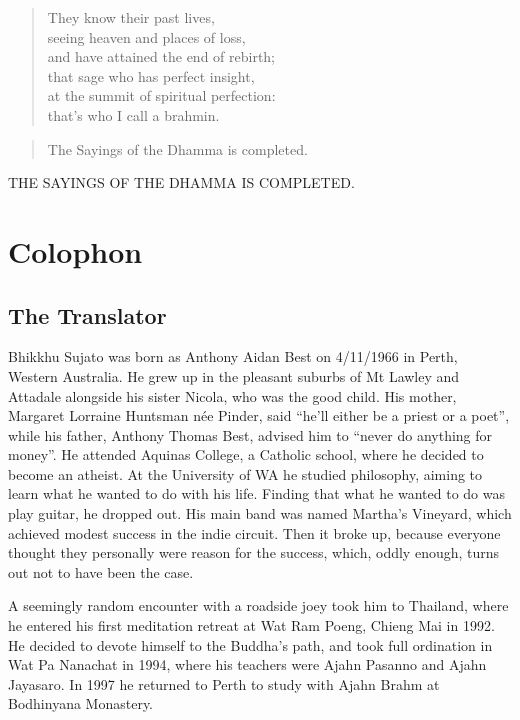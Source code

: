 \documentclass[12pt,openany]{book}%
\newcommand*{\scendbook}[1]{\begin{center}\uppercase{#1}\end{center}}
\let\oldbackmatter\backmatter
\renewcommand{\backmatter}{%
\chapterfont{\setstretch{.85}\normalfont\centering}%
\sectionfont{\setstretch{.85}\Semiboldsubheadfont}%
\oldbackmatter}
\begin{document}
\begin{verse}%
They know their past lives, \\
seeing heaven and places of loss, \\
and have attained the end of rebirth; \\
that sage who has perfect insight, \\
at the summit of spiritual perfection: \\
that’s who I call a brahmin. 

%
\end{verse}

\begin{verse}%
The Sayings of the Dhamma is completed. 

%
\end{verse}

\scendbook{The Sayings of the Dhamma is completed. }

%
\backmatter%
\chapter*{Colophon}

\section*{The Translator}

Bhikkhu Sujato was born as Anthony Aidan Best on 4/11/1966 in Perth, Western Australia. He grew up in the pleasant suburbs of Mt Lawley and Attadale alongside his sister Nicola, who was the good child. His mother, Margaret Lorraine Huntsman née Pinder, said “he’ll either be a priest or a poet”, while his father, Anthony Thomas Best, advised him to “never do anything for money”. He attended Aquinas College, a Catholic school, where he decided to become an atheist. At the University of WA he studied philosophy, aiming to learn what he wanted to do with his life. Finding that what he wanted to do was play guitar, he dropped out. His main band was named Martha’s Vineyard, which achieved modest success in the indie circuit. Then it broke up, because everyone thought they personally were reason for the success, which, oddly enough, turns out not to have been the case. 

A seemingly random encounter with a roadside joey took him to Thailand, where he entered his first meditation retreat at Wat Ram Poeng, Chieng Mai in 1992. He decided to devote himself to the Buddha’s path, and took full ordination in Wat Pa Nanachat in 1994, where his teachers were Ajahn Pasanno and Ajahn Jayasaro. In 1997 he returned to Perth to study with Ajahn Brahm at Bodhinyana Monastery. 
\end{document}
